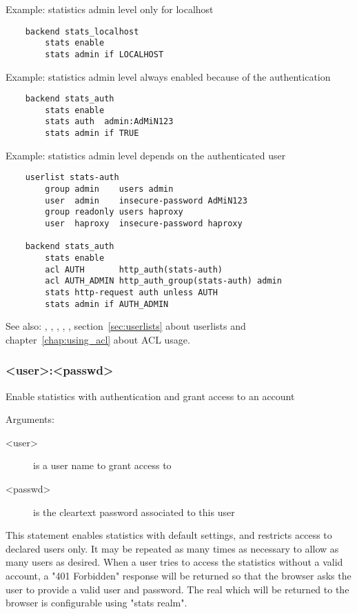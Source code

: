   Example: statistics admin level only for localhost
  \begin{verbatim}
    backend stats_localhost
        stats enable
        stats admin if LOCALHOST
  \end{verbatim}

  Example: statistics admin level always enabled because of the authentication
  \begin{verbatim}
    backend stats_auth
        stats enable
        stats auth  admin:AdMiN123
        stats admin if TRUE
  \end{verbatim}

  Example: statistics admin level depends on the authenticated user
  \begin{verbatim}
    userlist stats-auth
        group admin    users admin
        user  admin    insecure-password AdMiN123
        group readonly users haproxy
        user  haproxy  insecure-password haproxy

    backend stats_auth
        stats enable
        acl AUTH       http_auth(stats-auth)
        acl AUTH_ADMIN http_auth_group(stats-auth) admin
        stats http-request auth unless AUTH
        stats admin if AUTH_ADMIN
  \end{verbatim}


See also: , , , ,
            , section~\ref{sec:userlists} about userlists and chapter~\ref{chap:using_acl} about
             ACL usage.

\subsubsection[stats auth]{ <user>:<passwd>}

  Enable statistics with authentication and grant access to an account


  Arguments:
  \begin{description}
  \item[<user>] is a user name to grant access to
  \item[<passwd>] is the cleartext password associated to this user
  \end{description}

  This statement enables statistics with default settings, and restricts access
  to declared users only. It may be repeated as many times as necessary to
  allow as many users as desired. When a user tries to access the statistics
  without a valid account, a "401 Forbidden" response will be returned so that
  the browser asks the user to provide a valid user and password. The real
  which will be returned to the browser is configurable using "stats realm".

